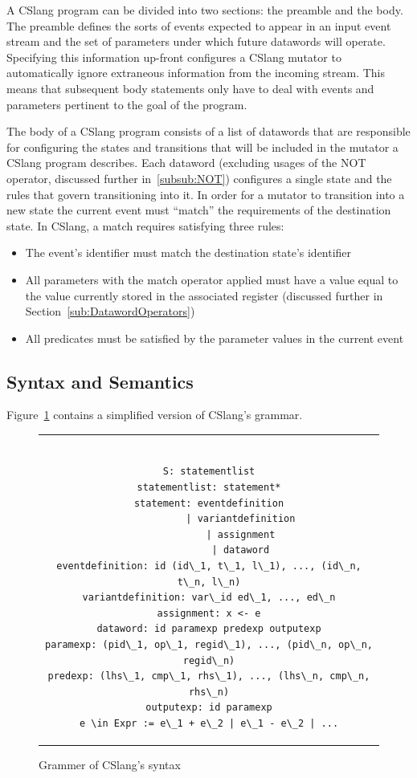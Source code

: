A CSlang program can be divided into two sections: the preamble and the body.
The preamble defines the sorts of events
expected
to appear in an input event stream and the set of parameters
under which future datawords will operate.  Specifying this information
up-front configures a CSlang mutator to
automatically ignore extraneous information from the incoming stream.  This
means that subsequent body statements only have to deal with events and
parameters pertinent to the goal of the program.

The body of a CSlang program consists of a list of datawords that
are responsible for configuring the states and transitions
that will be included in the mutator a CSlang program describes.
Each dataword (excluding usages of the NOT operator, discussed further
in~\ref{subsub:NOT}) configures a single
state and the rules that govern transitioning into it.
In order for a mutator to transition into a new state
the current event must ``match'' the requirements of the destination state.
In CSlang, a match requires satisfying three rules:

\begin{itemize}
\item{The event's identifier must match the destination state's identifier}
\item{All parameters with the match operator applied must have a value equal to
  the value currently stored in the associated register (discussed further
    in Section~\ref{sub:DatawordOperators})}
\item{All predicates must be satisfied by the parameter values in the
  current event}
\end{itemize}




\subsection{Syntax and Semantics}
\label{sub:SyntaxAndSemantics}

Figure~\ref{lst:SyntaxGrammar} contains a simplified
version of CSlang's grammar.

\begin{figure}[H]
\centering
\begin{tabular}{c}
\begin{lstlisting}

S: statementlist
statementlist: statement*
statement: eventdefinition
           | variantdefinition
           | assignment
           | dataword
eventdefinition: id (id\_1, t\_1, l\_1), ..., (id\_n, t\_n, l\_n)
variantdefinition: var\_id ed\_1, ..., ed\_n
assignment: x <- e
dataword: id paramexp predexp outputexp
paramexp: (pid\_1, op\_1, regid\_1), ..., (pid\_n, op\_n, regid\_n)
predexp: (lhs\_1, cmp\_1, rhs\_1), ..., (lhs\_n, cmp\_n, rhs\_n)
outputexp: id paramexp
e \in Expr := e\_1 + e\_2 | e\_1 - e\_2 | ...
\end{lstlisting}
\end{tabular}
\caption{Grammer of CSlang's syntax}
\label{lst:SyntaxGrammar}
\end{figure}


